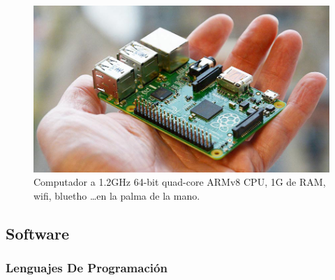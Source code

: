 \documentclass{article}
\begin{document}
\begin{figure}[hptp]
    \centering
    \includegraphics[scale=0.4]{imag/raspberryPi2.jpg}
    \caption{Computador a 1.2GHz 64-bit quad-core ARMv8 CPU, 1G de RAM,
	wifi, bluetho \dots en la palma de la mano.}
    \label{fig:rapberry}
\end{figure}
\smallskip

\subsection{Software}

\subsubsection{Lenguajes De Programación}
\end{document}
